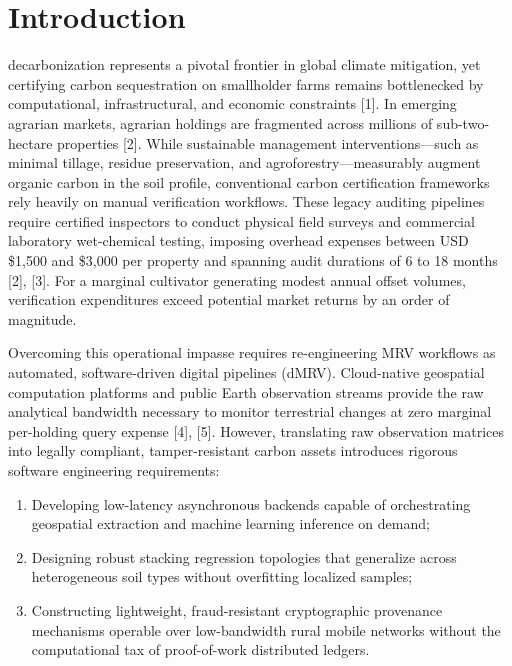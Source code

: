 \documentclass[10pt,a4paper,twocolumn]{IEEEtran}
\begin{document}
\section{Introduction}
 decarbonization represents a pivotal frontier in global climate mitigation, yet certifying carbon sequestration on smallholder farms remains bottlenecked by computational, infrastructural, and economic constraints [1]. In emerging agrarian markets, agrarian holdings are fragmented across millions of sub-two-hectare properties [2]. While sustainable management interventions---such as minimal tillage, residue preservation, and agroforestry---measurably augment organic carbon in the soil profile, conventional carbon certification frameworks rely heavily on manual verification workflows. These legacy auditing pipelines require certified inspectors to conduct physical field surveys and commercial laboratory wet-chemical testing, imposing overhead expenses between USD \$1,500 and \$3,000 per property and spanning audit durations of 6 to 18 months [2], [3]. For a marginal cultivator generating modest annual offset volumes, verification expenditures exceed potential market returns by an order of magnitude.

Overcoming this operational impasse requires re-engineering MRV workflows as automated, software-driven digital pipelines (dMRV). Cloud-native geospatial computation platforms and public Earth observation streams provide the raw analytical bandwidth necessary to monitor terrestrial changes at zero marginal per-holding query expense [4], [5]. However, translating raw observation matrices into legally compliant, tamper-resistant carbon assets introduces rigorous software engineering requirements:
\begin{enumerate}
  \item Developing low-latency asynchronous backends capable of orchestrating geospatial extraction and machine learning inference on demand;
  \item Designing robust stacking regression topologies that generalize across heterogeneous soil types without overfitting localized samples;
  \item Constructing lightweight, fraud-resistant cryptographic provenance mechanisms operable over low-bandwidth rural mobile networks without the computational tax of proof-of-work distributed ledgers.
\end{enumerate}
\end{document}
